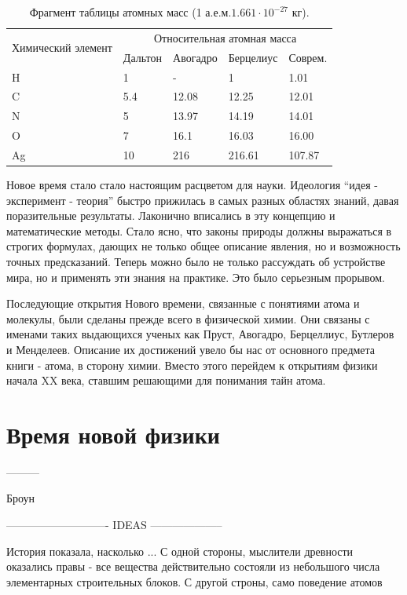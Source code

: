 \begin{table}
\label{tab:atom_mass}
    \begin{center}
        \begin{tabular}{|p{3cm}|p{2cm}|p{2cm}|p{2.2cm}|p{2cm}|}
            \hline
            \multirow{2}{}{Химический элемент} & \multicolumn{4}{|c|}{Относительная атомная масса} \\
            & Дальтон & Авогадро & Берцелиус & Соврем. \\
            \hline
            H & 1 & - & 1 & 1.01 \\
            C & 5.4 & 12.08 & 12.25 & 12.01 \\
            N & 5 & 13.97 & 14.19 & 14.01 \\
            O & 7 & 16.1 & 16.03 & 16.00 \\
            Ag & 10 & 216 & 216.61 & 107.87 \\
            \hline
        \end{tabular}
    \end{center}
\caption{Фрагмент таблицы атомных масс (1 а.е.м.\approx $1.661\cdot 10^{-27}$ кг).}
\end{table}

Новое время стало стало настоящим расцветом для науки.
Идеология ``идея - эксперимент - теория'' быстро прижилась в самых разных областях знаний, давая поразительные результаты.
Лаконично вписались в эту концепцию и математические методы.
Стало ясно, что законы природы должны выражаться в строгих формулах, дающих не только общее описание явления, но и возможность точных предсказаний.
Теперь можно было не только рассуждать об устройстве мира, но и применять эти знания на практике.
Это было серьезным прорывом.

Последующие открытия Нового времени, связанные с понятиями атома и молекулы, были сделаны прежде всего в физической химии. 
Они связаны с именами таких выдающихся ученых как Пруст, Авогадро, Берцеллиус, Бутлеров и Менделеев.
Описание их достижений увело бы нас от основного предмета книги - атома, в сторону химии.
Вместо этого перейдем к открытиям физики начала XX века, ставшим решающими для понимания тайн атома.


\section*{Время новой физики}

---------

Броун


---------------------------- IDEAS --------------------

История показала, насколько ...
С одной стороны, мыслители древности оказались правы - все вещества действительно состояли из небольшого числа элементарных строительных блоков.
С другой строны, само поведение атомов





